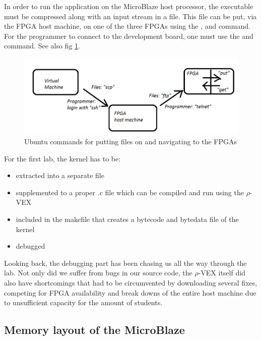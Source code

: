 {In order to run the application on the MicroBlaze host processor, the  executable must be compressed along with an input stream in a  file. This file can be put, via the FPGA host machine, on one of the three FPGAs using the ,  and  command. For the programmer to connect to the development board, one must use the  and  command. See also fig \ref{fig:hoppen}.

\begin{figure}[htb]%
\includegraphics[width=\columnwidth]{Pictures/hop}%
\caption{Ubuntu commands for putting files on and navigating to the FPGAs}%
\label{fig:hoppen}%
\end{figure}

For the first lab, the  kernel has to be:
\begin{itemize}
	\item extracted into a separate file
	\item supplemented to a proper .c file which can be compiled and run using the $\rho$-VEX
	\item included in the makefile that creates a bytecode and bytedata file of the kernel
	\item debugged
\end{itemize}

Looking back, the debugging part has been chasing us all the way through the lab. Not only did we suffer from bugs in our source code, the $\rho$-VEX itself did also have shortcomings that had to be circumvented by downloading several fixes, competing for FPGA availability and break downs of the entire host machine due to unsufficient capacity for the amount of students.

\subsection{Memory layout of the MicroBlaze}

}
